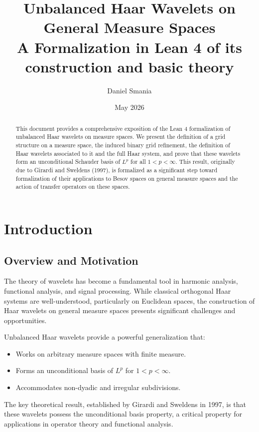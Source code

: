 \documentclass[12pt,a4paper]{article}
\title{\textbf{Unbalanced Haar Wavelets on General Measure Spaces}\\
  \large A Formalization in Lean 4 of its construction and basic theory}
\author{Daniel Smania}
\date{May 2026}
\theoremstyle{definition}
\newcommand{\Lp}[1]{L^{#1}}
\begin{document}
\maketitle

\begin{abstract}
This document provides a comprehensive exposition of the Lean 4 formalization of unbalanced Haar wavelets on measure spaces. We present the definition of  a  grid structure on a measure space, the induced binary grid refinement, the definition of Haar wavelets associated to it and the full Haar system, and prove that these wavelets form an unconditional Schauder basis of $\Lp{p}$ for all $1 < p < \infty$. This result, originally due to Girardi and Sweldens (1997), is formalized as a significant step toward formalization of   their applications to Besov spaces on general measure spaces and the action of transfer operators on these spaces. 
\end{abstract}

\tableofcontents

\newpage

\section{Introduction}

\subsection{Overview and Motivation}

The theory of wavelets has become a fundamental tool in harmonic analysis, functional analysis, and signal processing. While classical orthogonal Haar systems are well-understood, particularly on Euclidean spaces, the construction of Haar wavelets on general measure spaces presents significant challenges and opportunities.

Unbalanced Haar wavelets provide a powerful generalization that:
\begin{itemize}
  \item Works on arbitrary measure spaces with finite measure.
  \item Forms an unconditional basis of $\Lp{p}$ for $1 < p < \infty$.
  \item Accommodates non-dyadic and irregular subdivisions.
\end{itemize}

The key theoretical result, established by Girardi and Sweldens in 1997, is that these wavelets possess the unconditional basis property, a critical property for applications in  operator theory and functional analysis.
\end{document}
